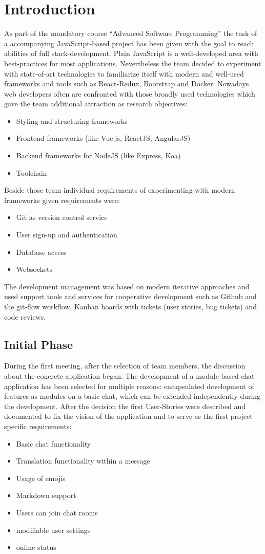\newpage
\section{Introduction}
As part of the mandatory course “Advanced Software Programming” the task of a accompanying JavaScript-based project has been given with the goal to reach abilities of full stack-development. Plain JavaScript is a well-developed area with best-practices for most applications. Nevertheless the team decided to experiment with state-of-art technologies to familiarize itself with modern and well-used frameworks and tools such as React-Redux, Bootstrap and Docker. Nowadays web developers often are confronted with those broadly used technologies which gave the team additional attraction as research objectives:
\begin{itemize}
	\item Styling and structuring frameworks
	\item Frontend frameworks (like Vue.js, ReactJS, AngularJS)
	\item Backend frameworks for NodeJS (like Express, Koa)
	\item Toolchain
\end{itemize}
Beside those team individual requirements of experimenting with modern frameworks given requirements were:
\begin{itemize}
	\item Git as version control service
	\item User sign-up and authentication
	\item Database access
	\item Websockets
\end{itemize}
The development management was based on modern iterative approaches and used support tools and services for cooperative development such as Github and the git-flow workflow, Kanban boards with tickets (user stories, bug tickets) and code reviews.

\subsection{Initial Phase}
During the first meeting, after the selection of team members, the discussion about the concrete application began. The development of a module based chat application has been selected for multiple reasons: encapsulated development of features as modules on a basic chat, which can be extended independently during the development. After the decision the first User-Stories were described and documented to fix the vision of the application and to serve as the first project specific requirements:
\begin{itemize}
	\item Basic chat functionality
	\item Translation functionality within a message
	\item Usage of emojis
	\item Markdown support
	\item Users can join chat rooms
	\item modifiable user settings
	\item online status
\end{itemize}

